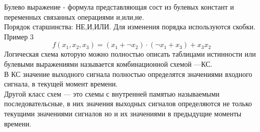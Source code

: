 Булево выражение - формула представляющая сост из булевых констант и переменных связанных операциями и,или,не.\\
Порядок старшинства: НЕ,И,ИЛИ. Для изменения порядка используются скобки.\\
Пример 3
$$f(x_1 ,x_2 ,x_3)= (x_1 + \neg x_2) \cdot (\neg x_1 + x_3) + x_3 x_2 $$
Логическая схема которую можно полностью описать таблицами истинности или булевыми выражениями называется комбинационной схемой —КС.\\
В КС значение выходного сигнала полностью определятся значениями входного сигнала, в текущей момент времени.\\
Другой класс схем — это схемы с внутренней памятью называемыми последовательсные, в них значения выходных сигналов определяются не только текущими значениями сигналов но и их значениями в предыдущие моменты времени.\\


